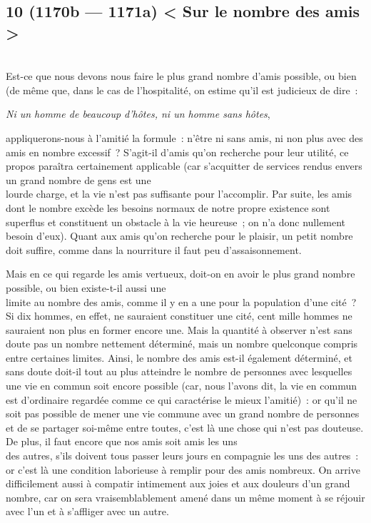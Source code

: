 \documentclass[french,twoside]{book} %
\begin{document}
\subsection[{10 (1170b — 1171a) < Sur le nombre des amis >}]{10 (1170b — 1171a) < Sur le nombre des amis >}
\noindent \\
Est-ce que nous devons nous faire le plus grand nombre d’amis possible, ou bien (de même que, dans le cas de l’hospitalité, on estime qu’il est judicieux de dire :\par
{\itshape Ni un homme de beaucoup d’hôtes, ni un homme sans hôtes}, \par
appliquerons-nous à l’amitié la formule : n’être ni sans amis, ni non plus avec des amis en nombre excessif ? S’agit-il d’amis qu’on recherche pour leur utilité, ce propos paraîtra certainement applicable (car s’acquitter de services rendus envers un grand nombre de gens est une \\
lourde charge, et la vie n’est pas suffisante pour l’accomplir. Par suite, les amis dont le nombre excède les besoins normaux de notre propre existence sont superflus et constituent un obstacle à la vie heureuse ; on n’a donc nullement besoin d’eux). Quant aux amis qu’on recherche pour le plaisir, un petit nombre doit suffire, comme dans la nourriture il faut peu d’assaisonnement.\par
Mais en ce qui regarde les amis vertueux, doit-on en avoir le plus grand nombre possible, ou bien existe-t-il aussi une \\
limite au nombre des amis, comme il y en a une pour la population d’une cité ? Si dix hommes, en effet, ne sauraient constituer une cité, cent mille hommes ne sauraient non plus en former encore une. Mais la quantité à observer n’est sans doute pas un nombre nettement déterminé, mais un nombre quelconque compris entre certaines limites. Ainsi, le nombre des  amis est-il également déterminé, et sans doute doit-il tout au plus atteindre le nombre de personnes avec lesquelles une vie en commun soit encore possible (car, nous l’avons dit, la vie en commun est d’ordinaire regardée comme ce qui caractérise le mieux l’amitié) : or qu’il ne soit pas possible de mener une vie commune avec un grand nombre de personnes et de se partager soi-même entre toutes, c’est là une chose qui n’est pas douteuse. De plus, il faut encore que nos amis soit amis les uns \\
des autres, s’ils doivent tous passer leurs jours en compagnie les uns des autres : or c’est là une condition laborieuse à remplir pour des amis nombreux. On arrive difficilement aussi à compatir intimement aux joies et aux douleurs d’un grand nombre, car on sera vraisemblablement amené dans un même moment à se réjouir avec l’un et à s’affliger avec un autre.\par
\end{document}
